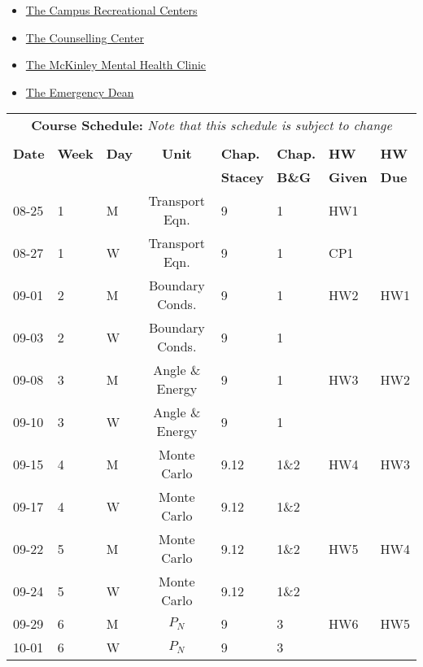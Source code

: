 \documentclass[11pt, a4paper]{article}
\begin{document}
\begin{itemize}
\item \href{https://campusrec.illinois.edu/}{The Campus Recreational Centers}
\item \href{http://counselingcenter.illinois.edu/}{The Counselling Center}
\item \href{http://www.mckinley.illinois.edu/clinics/mental\_health.htm}{The McKinley Mental Health Clinic}
\item \href{http://odos.illinois.edu/emergency/}{The Emergency Dean}
\end{itemize}


\pagebreak
\FloatBarrier
\renewcommand{\arraystretch}{1}
\begin{table}[h]
\begin{center}
\begin{tabular}{lllcllll}
\multicolumn{8}{c}{\textbf{Course Schedule:}\textit{ Note that this schedule is subject to change}}\\
&&&&&&&\\
\textbf{Date} & \textbf{Week} & \textbf{Day} & \textbf{Unit} & \textbf{Chap.} & \textbf{Chap.} & \textbf{HW} & \textbf{HW}\\
              &  &  & & \textbf{Stacey}& \textbf{B\&G} & \textbf{Given} & \textbf{Due}\\
\hline
\hline
08-25 & 1 & M  & Transport Eqn.          & 9    & 1    & HW1 &     \\
08-27 & 1 & W  & Transport Eqn.          & 9    & 1    & CP1 &     \\
09-01 & 2 & M  & Boundary Conds.         & 9    & 1    & HW2 & HW1 \\
09-03 & 2 & W  & Boundary Conds.         & 9    & 1    &     &     \\
09-08 & 3 & M  & Angle \& Energy         & 9    & 1    & HW3 & HW2 \\
09-10 & 3 & W  & Angle \& Energy         & 9    & 1    &     &     \\
09-15 & 4 & M  & Monte Carlo             & 9.12 & 1\&2 & HW4 & HW3 \\
09-17 & 4 & W  & Monte Carlo             & 9.12 & 1\&2 &     &     \\
09-22 & 5 & M  & Monte Carlo             & 9.12 & 1\&2 & HW5 & HW4 \\
09-24 & 5 & W  & Monte Carlo             & 9.12 & 1\&2 &     &     \\
09-29 & 6 & M  & $P_N$                   & 9    & 3    & HW6 & HW5 \\
10-01 & 6 & W  & $P_N$                   & 9    & 3    &     &     \\

\end{tabular}
\end{center}
\end{table}
\end{document}
